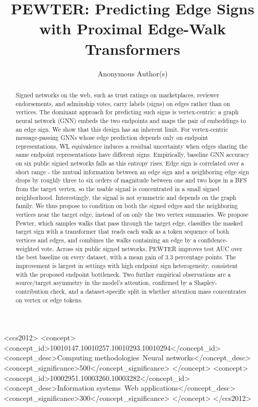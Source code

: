\documentclass[sigconf, review, anonymous]{acmart}
\theoremstyle{plain}
\theoremstyle{definition}
\begin{document}
\title{PEWTER: Predicting Edge Signs with Proximal Edge-Walk Transformers}

\author{Anonymous Author(s)}

\begin{abstract}
Signed networks on the web, such as trust ratings on marketplaces, reviewer endorsements, and adminship votes, carry labels (signs) on edges rather than on vertices. The dominant approach for predicting such signs is vertex-centric: a graph neural network (GNN) embeds the two endpoints and maps the pair of embeddings to an edge sign. We show that this design has an inherent limit. For vertex-centric message-passing GNNs whose edge prediction depends only on endpoint representations, WL equivalence induces a residual uncertainty when edges sharing the same endpoint representations have different signs. Empirically, baseline GNN accuracy on six public signed networks falls as this entropy rises. Edge sign is correlated over a short range - the mutual information between an edge sign and a neighboring edge sign drops by roughly three to six orders of magnitude between one and two hops in a BFS from the target vertex, so the usable signal is concentrated in a small signed neighborhood. Interestingly, the signal is not symmetric and depends on the graph family. We thus propose to condition on both the signed edges and the neighboring vertices near the target edge, instead of on only the two vertex summaries. We propose Pewter, which samples walks that pass through the target edge, classifies the masked target sign with a transformer that reads each walk as a token sequence of both vertices and edges, and combines the walks containing an edge by a confidence-weighted vote. Across six public signed networks, PEWTER improves test AUC over the best baseline on every dataset, with a mean gain of 3.3 percentage points. The improvement is largest in settings with high endpoint sign heterogeneity, consistent with the proposed endpoint bottleneck. Two further empirical observations are a source/target asymmetry in the model's attention, confirmed by a Shapley-contribution check, and a dataset-specific split in whether attention mass concentrates on vertex or edge tokens.
\end{abstract}

\begin{CCSXML}
<ccs2012>
   <concept>
       <concept_id>10010147.10010257.10010293.10010294</concept_id>
       <concept_desc>Computing methodologies~Neural networks</concept_desc>
       <concept_significance>500</concept_significance>
       </concept>
   <concept>
       <concept_id>10002951.10003260.10003282</concept_id>
       <concept_desc>Information systems~Web applications</concept_desc>
       <concept_significance>300</concept_significance>
       </concept>
 </ccs2012>
\end{CCSXML}
\end{document}
